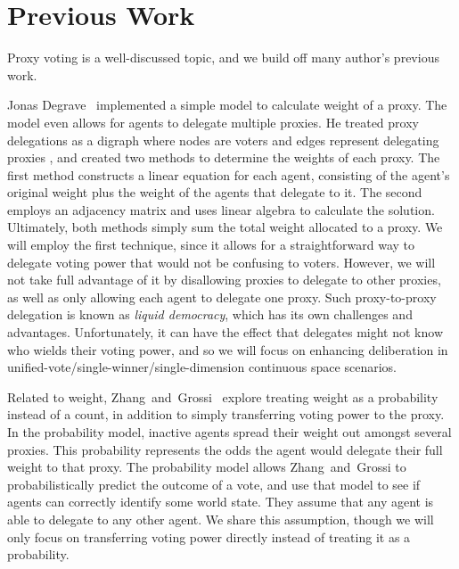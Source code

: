 \section{Previous Work}\label{sec:previous-work}
Proxy voting is a well-discussed topic, and we build off many author's previous work.

Jonas Degrave~\cite{Degrave2014} implemented a simple model to calculate 
weight of a proxy.
The model even allows for agents to delegate multiple proxies.
He treated proxy delegations as a digraph where nodes are voters and edges represent
delegating proxies   , and created two methods to determine the weights of each proxy.
The first method constructs a linear equation for each agent, consisting of the
agent's original weight plus the weight of the agents that delegate to it.
The second employs an adjacency matrix and uses linear algebra to calculate the
solution.
Ultimately, both methods simply sum the total weight allocated to a proxy.
We will employ the first technique, since it allows for a straightforward way to
delegate voting power that would not be confusing to voters.
However, we will not take full advantage of it by disallowing proxies to delegate to
other proxies, as well as only allowing each agent to delegate one proxy.
Such proxy-to-proxy delegation is known as \textit{liquid democracy}, which has its own
challenges and advantages.
Unfortunately, it can have the effect that delegates might not know who wields their
voting power, and so we will focus on enhancing deliberation in
unified-vote/single-winner/single-dimension continuous space scenarios.

Related to weight, Zhang~and~Grossi~\cite{Zhang2022} explore treating weight as a
probability instead of a count, in addition to simply transferring voting power to
the proxy.
In the probability model, inactive agents spread their weight out amongst several
proxies.
This probability represents the odds the agent would delegate their full weight to that
proxy.
The probability model allows Zhang~and~Grossi to probabilistically predict the
outcome of a vote, and use that model to see if agents can correctly identify some
world state.
They assume that any agent is able to delegate to any other agent.
We share this assumption, though we will only focus on transferring voting power
directly instead of treating it as a probability.

